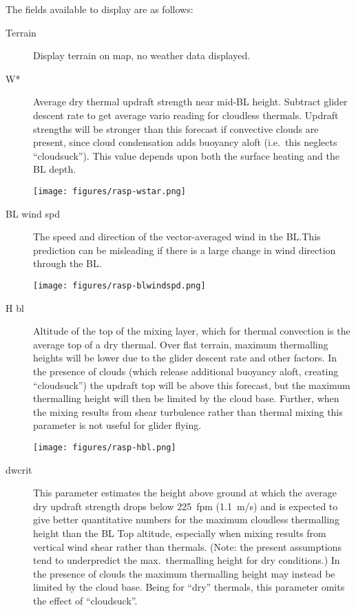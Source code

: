 The fields available to display are as follows:
\begin{description}
\item[Terrain] Display terrain on map, no weather data displayed.

\item[W*] 
Average dry thermal updraft strength near mid-BL height.  Subtract
glider descent rate to get average vario reading for cloudless
thermals.  Updraft strengths will be stronger than this forecast if
convective clouds are present, since cloud condensation adds buoyancy
aloft (i.e.\ this neglects ``cloudsuck'').  This value depends upon both
the surface heating and the BL depth.

\begin{center}
\texttt{[image: figures/rasp-wstar.png]}
\end{center}

\item[BL wind spd] 
The speed and direction of the vector-averaged wind in the BL.\@  This
prediction can be misleading if there is a large change in wind
direction through the BL.\@

\begin{center}
\texttt{[image: figures/rasp-blwindspd.png]}
\end{center}

\item[H bl]  
Altitude of the top of the mixing layer, which for thermal convection is
the average top of a dry thermal.  Over flat terrain, maximum
thermalling heights will be lower due to the glider descent rate and
other factors.  In the presence of clouds (which release additional
buoyancy aloft, creating ``cloudsuck'') the updraft top will be above
this forecast, but the maximum thermalling height will then be limited
by the cloud base.  Further, when the mixing results from shear
turbulence rather than thermal mixing this parameter is not useful for
glider flying.

\begin{center}
\texttt{[image: figures/rasp-hbl.png]}
\end{center}

\item[dwcrit]  
This parameter estimates the height above ground at which the average
dry updraft strength drops below 225~fpm (1.1~m/s) and is expected to give
better quantitative numbers for the maximum cloudless thermalling
height than the BL Top altitude, especially when mixing results from
vertical wind shear rather than thermals.  (Note: the present
assumptions tend to underpredict the max.\ thermalling height for dry
conditions.) In the presence of clouds the maximum thermalling height
may instead be limited by the cloud base.  Being for ``dry'' thermals,
this parameter omits the effect of ``cloudsuck''.


\end{description}
